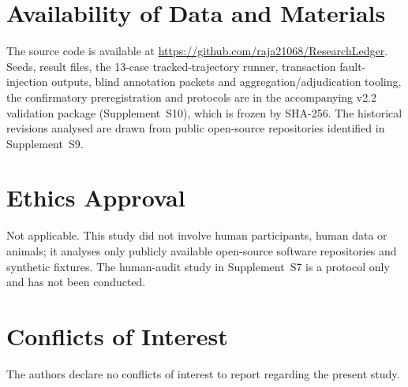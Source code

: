 \documentclass[journal]{IEEEtran}
\newcommand{\suppl}[1]{Supplement~#1}
\begin{document}
\section*{Availability of Data and Materials}
The source code is available at \url{https://github.com/raja21068/ResearchLedger}. Seeds, result files, the 13-case tracked-trajectory runner, transaction fault-injection outputs, blind annotation packets and aggregation/adjudication tooling, the confirmatory preregistration and protocols are in the accompanying v2.2 validation package (\suppl{S10}), which is frozen by SHA-256. The historical revisions analysed are drawn from public open-source repositories identified in \suppl{S9}.

\section*{Ethics Approval}
Not applicable. This study did not involve human participants, human data or animals; it analyses only publicly available open-source software repositories and synthetic fixtures. The human-audit study in \suppl{S7} is a protocol only and has not been conducted.

\section*{Conflicts of Interest}
The authors declare no conflicts of interest to report regarding the present study.

\printbibliography
\end{document}
